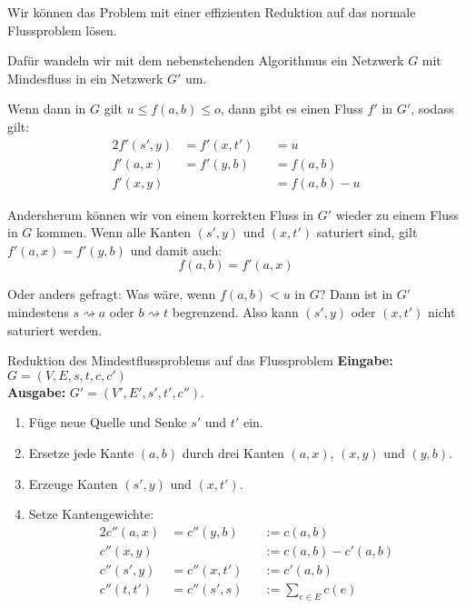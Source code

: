 \documentclass{panikzettel}
\begin{document}
\begin{halfboxl}
Wir können das Problem mit einer effizienten Reduktion auf das normale Flussproblem lösen.

Dafür wandeln wir mit dem nebenstehenden Algorithmus ein Netzwerk $G$ mit Mindesfluss in ein Netzwerk $G'$ um.

Wenn dann in $G$ gilt $u \leq f(a,b) \leq o$, dann gibt es einen Fluss $f'$ in $G'$, sodass gilt:
\begin{alignat*}{2}
    f'(s',y) &= f'(x,t') &&= u \\
    f'(a,x) &= f'(y,b) &&= f(a,b) \\
    f'(x,y) & &&=f(a,b) - u
\end{alignat*}

Andersherum können wir von einem korrekten Fluss in $G'$ wieder zu einem Fluss in $G$ kommen.
Wenn alle Kanten $(s',y)$ und $(x,t')$ saturiert sind, gilt $f'(a,x) = f'(y,b)$ und damit auch:
\[ f(a,b) = f'(a,x) \]

Oder anders gefragt: Was wäre, wenn $f(a,b) < u$ in $G$? Dann ist in $G'$ mindestens $s \rightsquigarrow a$ oder $b \rightsquigarrow t$ begrenzend. Also kann $(s',y)$ oder $(x,t')$ nicht saturiert werden.
\end{halfboxl}%
\begin{halfboxr}
\vspace{-\baselineskip}
\begin{algo}{Reduktion des Mindestflussproblems auf das Flussproblem}
\textbf{Eingabe:} $G = (V, E, s, t, c, c')$ \\
\textbf{Ausgabe:} $G' = (V', E', s', t', c'')$.
\tcblower
\begin{enumerate}[nosep]
    \item Füge neue Quelle und Senke $s'$ und $t'$ ein.
    \item Ersetze jede Kante $(a,b)$ durch drei Kanten $(a,x)$, $(x,y)$ und $(y,b)$.
    \item Erzeuge Kanten $(s',y)$ und $(x,t')$.
    \item Setze Kantengewichte:
        \begin{alignat*}{2}
            c''(a,x) &= c''(y,b) &&:= c(a,b) \\
            c''(x,y) & &&:= c(a,b) - c'(a,b) \\
            c''(s', y) &= c''(x, t') &&:= c'(a,b) \\
            c''(t,t') &= c''(s',s) &&:= \sum\limits_{e \in E} c(e)
        \end{alignat*}
\end{enumerate}
\end{algo}
\end{halfboxr}
\end{document}
